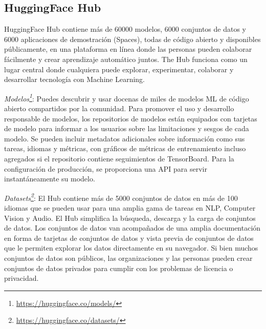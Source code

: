 \subsection{HuggingFace Hub}
HuggingFace Hub contiene más de 60000 modelos, 6000 conjuntos de datos y 6000 aplicaciones de demostración (Spaces), todas de código abierto y disponibles públicamente, en una plataforma en línea donde las personas pueden colaborar fácilmente y crear aprendizaje automático juntos. The Hub funciona como un lugar central donde cualquiera puede explorar, experimentar, colaborar y desarrollar tecnología con Machine Learning. 

\textit{Modelos\footnote[3]{\url{https://huggingface.co/models/}}}: Puedes descubrir y usar docenas de miles de modelos ML de código abierto compartidos por la comunidad. Para promover el uso y desarrollo responsable de modelos, los repositorios de modelos están equipados con tarjetas de modelo para informar a los usuarios sobre las limitaciones y sesgos de cada modelo. Se pueden incluir metadatos adicionales sobre información como sus tareas, idiomas y métricas, con gráficos de métricas de entrenamiento incluso agregados si el repositorio contiene seguimientos de TensorBoard. Para la configuración de producción, se proporciona una API para servir instantáneamente su modelo.

\textit{Datasets\footnote[4]{\url{https://huggingface.co/datasets/}}}: El Hub contiene más de 5000 conjuntos de datos en más de 100 idiomas que se pueden usar para una amplia gama de tareas en NLP, Computer Vision y Audio. El Hub simplifica la búsqueda, descarga y la carga de conjuntos de datos. Los conjuntos de datos van acompañados de una amplia documentación en forma de tarjetas de conjuntos de datos y vista previa de conjuntos de datos que le permiten explorar los datos directamente en su navegador. Si bien muchos conjuntos de datos son públicos, las organizaciones y las personas pueden crear conjuntos de datos privados para cumplir con los problemas de licencia o privacidad.